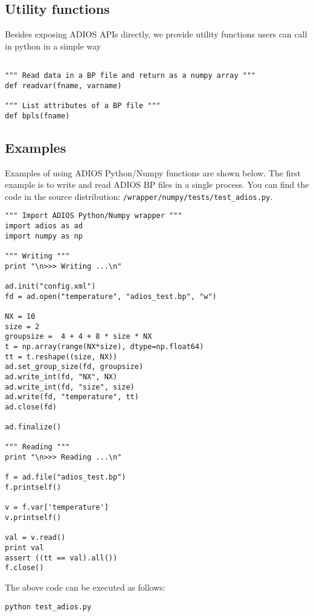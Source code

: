 \subsection{Utility functions}
Besides exposing ADIOS APIs directly, we provide utility functions users can call in python in a simple way

\begin{lstlisting}[language=cython,caption={Utility functions},label={},]

""" Read data in a BP file and return as a numpy array """
def readvar(fname, varname)

""" List attributes of a BP file """
def bpls(fname)

\end{lstlisting}

\subsection{Examples}
Examples of using ADIOS Python/Numpy functions are shown below. The first example is to write and read ADIOS BP files in a single process. You can find the code in the source distribution: \verb+/wrapper/numpy/tests/test_adios.py+.

\begin{lstlisting}[language=ADIOS-python,caption={A Python/Numpy example for writing/reading ADIOS BP file},label={},]
""" Import ADIOS Python/Numpy wrapper """
import adios as ad
import numpy as np

""" Writing """
print "\n>>> Writing ...\n"

ad.init("config.xml")
fd = ad.open("temperature", "adios_test.bp", "w")

NX = 10
size = 2
groupsize =  4 + 4 + 8 * size * NX
t = np.array(range(NX*size), dtype=np.float64)
tt = t.reshape((size, NX))
ad.set_group_size(fd, groupsize)
ad.write_int(fd, "NX", NX)
ad.write_int(fd, "size", size)
ad.write(fd, "temperature", tt)
ad.close(fd)

ad.finalize()

""" Reading """
print "\n>>> Reading ...\n"

f = ad.file("adios_test.bp")
f.printself()

v = f.var['temperature']
v.printself()

val = v.read()
print val
assert ((tt == val).all())
f.close()

\end{lstlisting}

The above code can be executed as follows:
\begin{lstlisting}
python test_adios.py
\end{lstlisting}

